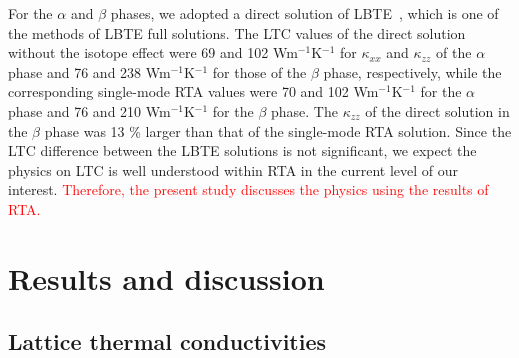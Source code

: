 \documentclass[twocolumn,amsmath,amssymb,a4paper,prb,superscriptaddress,floatfix]{revtex4-1}
\begin{document}
For the $\alpha$ and $\beta$ phases, we adopted a direct solution of
LBTE~\cite{chaput-direct}, which is one of the methods of LBTE full solutions.
The LTC values of the direct solution without the isotope effect were  69 and
102 Wm$^{-1}$K$^{-1}$ for $\kappa_{xx}$ and $\kappa_{zz}$  of the $\alpha$
phase and 76 and 238 Wm$^{-1}$K$^{-1}$ for those of the $\beta$ phase,
respectively, while the corresponding single-mode RTA values were 70 and 102
Wm$^{-1}$K$^{-1}$ for the $\alpha$ phase and 76 and 210 Wm$^{-1}$K$^{-1}$ for
the $\beta$ phase. The $\kappa_{zz}$ of the direct solution in the $\beta$
phase was 13 \% larger than that of the single-mode RTA solution. Since the LTC
difference between the LBTE solutions is not significant, we expect the physics
on LTC is well understood within RTA in the current level of our interest.
\textcolor {red} {Therefore, the present study discusses the physics using the results of RTA.}

\section{Results and discussion}

\subsection{Lattice thermal conductivities}
\end{document}
